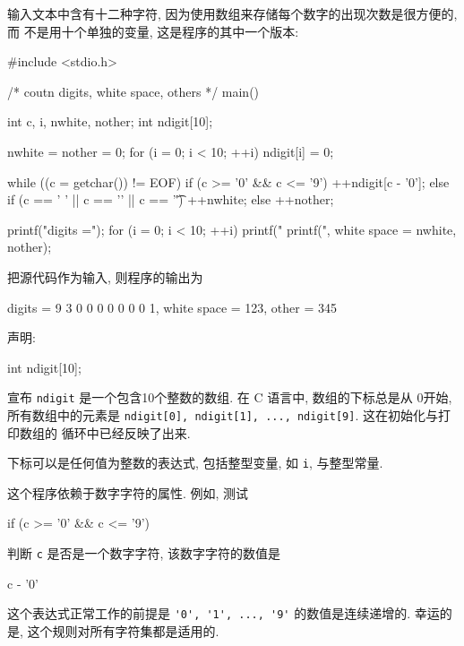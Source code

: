 输入文本中含有十二种字符, 因为使用数组来存储每个数字的出现次数是很方便的, 而
不是用十个单独的变量, 这是程序的其中一个版本:
\begin{myverbatim}
    #include <stdio.h>

    /* coutn digits, white space, others */
    main()
    {
        int c, i, nwhite, nother;
        int ndigit[10];

        nwhite = nother = 0;
        for (i = 0; i < 10; ++i)
            ndigit[i] = 0;

        while ((c = getchar()) != EOF)
            if (c >= '0' && c <= '9')
                ++ndigit[c - '0'];
            else if (c == ' ' || c == '\n' || c == '\t')
                ++nwhite;
            else 
                ++nother;

        printf("digits =");
        for (i = 0; i < 10; ++i)
            printf(" %
        printf(", white space = %
            nwhite, nother);
    }
\end{myverbatim}
把源代码作为输入, 则程序的输出为
\begin{myverbatim}
    digits = 9 3 0 0 0 0 0 0 0 1, white space = 123, other = 345
\end{myverbatim}
声明:
\begin{myverbatim}
    int ndigit[10];
\end{myverbatim}
宣布 \verb"ndigit" 是一个包含10个整数的数组. 在 C 语言中, 数组的下标总是从
0开始, 所有数组中的元素是 \verb"ndigit[0], ndigit[1], ..., ndigit[9]".
这在初始化与打印数组的 \cfor 循环中已经反映了出来.

下标可以是任何值为整数的表达式, 包括整型变量, 如 \verb"i", 与整型常量.

这个程序依赖于数字字符的属性. 例如, 测试
\begin{myverbatim}
    if (c >= '0' && c <= '9')
\end{myverbatim}
判断 \verb"c" 是否是一个数字字符, 该数字字符的数值是
\begin{myverbatim}
    c - '0'
\end{myverbatim}
这个表达式正常工作的前提是 \verb"'0', '1', ..., '9'" 的数值是连续递增的.
幸运的是, 这个规则对所有字符集都是适用的.

